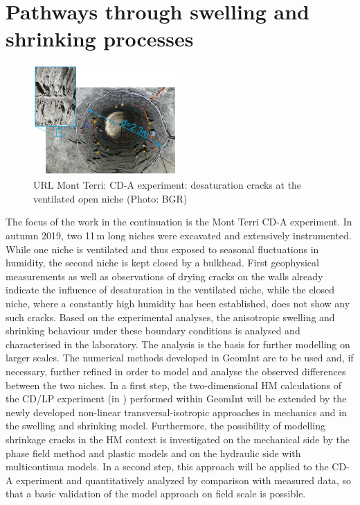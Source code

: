 \section{Pathways through swelling and shrinking processes}
\label{sec:wp1-plan}

\begin{figure}
\vspace{-5mm}
\centering
\includegraphics[width=0.49\textwidth]{figures/CDA_open_niche}
\caption{URL Mont Terri: CD-A experiment: desaturation cracks at the ventilated open niche (Photo: BGR)}
\label{fig:syn-cd-a}
\end{figure}
The focus of the work in the continuation is the Mont Terri CD-A experiment. In autumn 2019, two 11\,m long niches were excavated and extensively instrumented. While one niche is ventilated and thus exposed to seasonal fluctuations in humidity, the second niche is kept closed by a bulkhead. First geophysical measurements as well as observations of drying cracks on the walls already indicate the influence of desaturation in the ventilated niche, while the closed niche, where a constantly high humidity has been established, does not show any such cracks. Based on the experimental analyses, the anisotropic swelling and shrinking behaviour under these boundary conditions is analysed and characterised in the laboratory. The analysis is the basis for further modelling on larger scales. 
The numerical methods \cite{Yoshioka2019,Parisio2019102} developed in GeomInt are to be used and, if necessary, further refined in order to model and analyse the observed differences between the two niches. In a first step, the two-dimensional HM calculations of the CD/LP experiment (in \cite{Kolditz2020b}) performed within GeomInt will be extended by the newly developed non-linear transversal-isotropic approaches in mechanics and in the swelling and shrinking model. Furthermore, the possibility of modelling shrinkage cracks in the HM context is investigated on the mechanical side by the phase field method and plastic models and on the hydraulic side with multicontinua models. In a second step, this approach will be applied to the CD-A experiment and quantitatively analyzed by comparison with measured data, so that a basic validation of the model approach on field scale is possible. 

